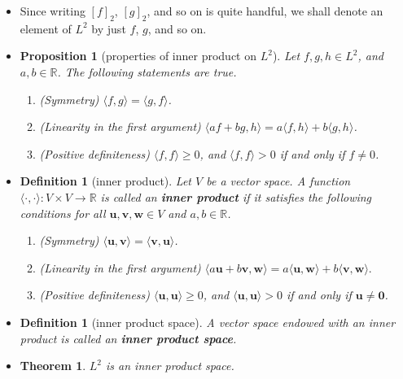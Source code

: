 \documentclass[10pt]{article}
\newtheorem{theorem}[lemma]{Theorem}
\newtheorem{definition}[lemma]{Definition}
\newtheorem{proposition}[lemma]{Proposition}
\numberwithin{lemma}{section}
\newcommand{\ve}[1]{\mathbf{#1}}
\newcommand{\Real}{\mathbb{R}}
\begin{document}
\begin{itemize}
  \item Since writing $[f]_2$, $[g]_2$, and so on is quite handful, we shall denote an element of $L^2$ by just $f$, $g$, and so on.
  
  \item \begin{proposition}[properties of inner product on $L^2$]
    Let $f,g,h \in L^2$, and $a,b \in \Real$. The following statements are true.
    \begin{enumerate}
      \item (Symmetry) $\langle f, g \rangle = \langle g, f \rangle$.
      \item (Linearity in the first argument) $\langle af + bg, h \rangle = a\langle f, h \rangle + b\langle g, h \rangle$.
      \item (Positive definiteness) $\langle f, f \rangle \geq 0$, and $\langle f, f \rangle > 0$ if and only if $f \neq 0$.
    \end{enumerate}
  \end{proposition}

  \item \begin{definition}[inner product]
    Let $V$ be a vector space. A function $\langle \cdot, \cdot \rangle: V \times V \rightarrow \Real$ is called an {\bf inner product} if it satisfies the following conditions for all $\ve{u}, \ve{v}, \ve{w} \in V$ and $a,b \in \Real$.
    \begin{enumerate}
      \item (Symmetry) $\langle \ve{u}, \ve{v} \rangle = \langle \ve{v}, \ve{u} \rangle$.
      \item (Linearity in the first argument) $\langle a\ve{u} + b\ve{v}, \ve{w} \rangle = a\langle \ve{u}, \ve{w} \rangle + b\langle \ve{v}, \ve{w} \rangle.$
      \item (Positive definiteness) $\langle \ve{u}, \ve{u} \rangle \geq 0$, and $\langle \ve{u}, \ve{u} \rangle > 0$ if and only if $\ve{u} \neq \ve{0}$.
    \end{enumerate}
  \end{definition}

  \item \begin{definition}[inner product space]
    A vector space endowed with an inner product is called an {\bf inner product space}.
  \end{definition}

  \item \begin{theorem}
    $L^2$ is an inner product space.
  \end{theorem}


\end{itemize}
\end{document}
